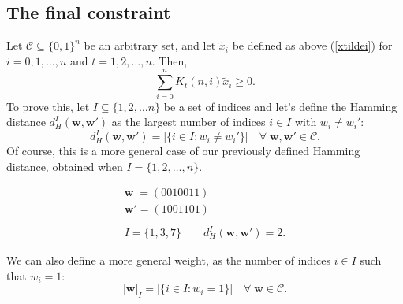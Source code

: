 \subsection{The final constraint}
Let $\mathcal{C} \subseteq \{0,1\}^n$ be an arbitrary set, and let $\tilde{x}_i$ be defined as above (\ref{xtildei}) for $i=0,1,\ldots,n$ and $t=1,2,\ldots,n$.
Then,
\begin{equation*}
    \sum_{i=0}^{n}K_t(n,i) \tilde{x}_i \geq 0.
\end{equation*}
To prove this, let $I \subseteq \{1,2,\ldots n\}$ be a set of indices and let's define the Hamming distance $d_H^I(\mathbf{w}, \mathbf{w}')$ as the largest number of indices $i \in I$ with $w_i \neq w_i'$:
\begin{equation}
    d_H^I(\mathbf{w}, \mathbf{w}') = |\{i \in I : w_i \neq w_i'\}| \quad\forall\; \mathbf{w}, \mathbf{w}' \in \mathcal{C}.
\end{equation}
Of course, this is a more general case of our previously defined Hamming distance, obtained when $I = \{1, 2, \ldots, n\}$.
\begin{example}
    \begin{equation*}
        \begin{array}{l}
            \mathbf{w} \;= (0010011) \\
            \mathbf{w}' = (1001101) \\\\
            I = \{1,3,7\} \quad\quad d_H^I(\mathbf{w}, \mathbf{w}') = 2.
        \end{array}
    \end{equation*}
\end{example}
We can also define a more general weight, as the number of indices $i \in I$ such that $w_i=1$:
\begin{equation}
    |\mathbf{w}|_I = |\{i \in I : w_i = 1\}| \quad\forall\;\mathbf{w}\in\mathcal{C}.
\end{equation}
